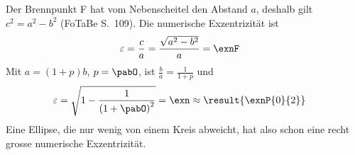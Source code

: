 \begin{center}
\end{center}

Der Brennpunkt F hat vom Nebenscheitel den Abstand $a$, deshalb gilt $c^2 = a^2 - b^2$ (FoTaBe S.~109). Die numerische Exzentrizität ist
\begin{align}
 \varepsilon &= \frac{c}{a} = \frac{\sqrt{a^2-b^2}}{a} = \exnF
\end{align}
Mit $a = \left(1+p\right)b$, $p = \pabO$, ist $\frac{b}{a} = \frac{1}{1+p}$ und
\begin{align}
 \varepsilon &= \sqrt{1-\frac{1}{\left(1+\pabO\right)^2}} = \exn \approx \result{\exnP{0}{2}}
\end{align}
Eine Ellipse, die nur wenig von einem Kreis abweicht, hat also schon eine recht grosse numerische Exzentrizität.
